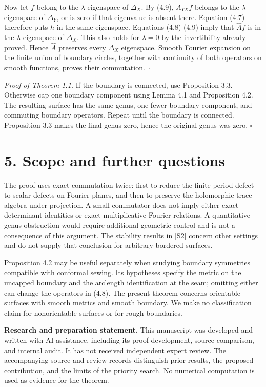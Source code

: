 \documentclass[11pt]{article}
\begin{document}
Now let \(f\) belong to the \(\lambda\) eigenspace of \(\Delta_X\). By
(4.9), \(A_{YX}f\) belongs to the \(\lambda\) eigenspace of
\(\Delta_Y\), or is zero if that eigenvalue is absent there. Equation
(4.7) therefore puts \(h\) in the same eigenspace. Equations (4.8)-(4.9)
imply that \(\widehat Af\) is in the \(\lambda\) eigenspace of
\(\Delta_X\). This also holds for \(\lambda=0\) by the invertibility
already proved. Hence \(\widehat A\) preserves every \(\Delta_X\)
eigenspace. Smooth Fourier expansion on the finite union of boundary
circles, together with continuity of both operators on smooth functions,
proves their commutation. \(\square\)

\emph{Proof of Theorem 1.1.} If the boundary is connected, use
Proposition 3.3. Otherwise cap one boundary component using Lemma 4.1
and Proposition 4.2. The resulting surface has the same genus, one fewer
boundary component, and commuting boundary operators. Repeat until the
boundary is connected. Proposition 3.3 makes the final genus zero, hence
the original genus was zero. \(\square\)

\section{5. Scope and further
questions}\label{scope-and-further-questions}

The proof uses exact commutation twice: first to reduce the
finite-period defect to scalar defects on Fourier planes, and then to
preserve the holomorphic-trace algebra under projection. A small
commutator does not imply either exact determinant identities or exact
multiplicative Fourier relations. A quantitative genus obstruction would
require additional geometric control and is not a consequence of this
argument. The stability results in {[}S2{]} concern other settings and
do not supply that conclusion for arbitrary bordered surfaces.

Proposition 4.2 may be useful separately when studying boundary
symmetries compatible with conformal sewing. Its hypotheses specify the
metric on the uncapped boundary and the arclength identification at the
seam; omitting either can change the operators in (4.8). The present
theorem concerns orientable surfaces with smooth metrics and smooth
boundary. We make no classification claim for nonorientable surfaces or
for rough boundaries.

\textbf{Research and preparation statement.} This manuscript was
developed and written with AI assistance, including its proof
development, source comparison, and internal audit. It has not received
independent expert review. The accompanying source and review records
distinguish prior results, the proposed contribution, and the limits of
the priority search. No numerical computation is used as evidence for
the theorem.
\end{document}
